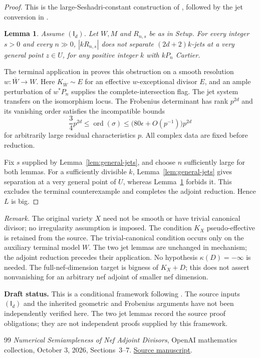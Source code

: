 \documentclass[12pt,a4paper,psamsfonts]{amsart}
\theoremstyle{definition}
\theoremstyle{plain}
\newtheorem{lemma}{Lemma}[section]
\DeclareMathOperator{\ord}{ord}
\begin{document}
\begin{proof}
This is the large-Seshadri-constant construction of
\cite[Section~5]{NS}, followed by the jet conversion in
\cite[Section~6.7]{NS}.

\begin{lemma}\label{lem:general-nojets}
Assume $(\mathsf I_d)$. Let $W,M$ and $R_{n,s}$ be as in Setup.
For every integer $s>0$ and every $n\gg0$, $|kR_{n,s}|$ does not
separate $(2d+2)k$-jets at a very general point $z\in U$, for any
positive integer $k$ with $kP_n$ Cartier.
\end{lemma}

The terminal application in \cite[Section~6.7]{NS} proves this
obstruction on a smooth resolution $w:\overline W\to W$.
Here $K_{\overline W}\sim E$ for an effective $w$-exceptional
divisor $E$, and an ample perturbation of $w^*P_n$ supplies the
complete-intersection flag. The jet system transfers on the
isomorphism locus. The Frobenius determinant has rank
$p^{2d}$ and its vanishing order satisfies the incompatible bounds
\[
 \frac34p^{2d}\le\ord(\sigma)
 \le\bigl(80\epsilon+O(p^{-1})\bigr)p^{2d}
\]
for arbitrarily large residual characteristics $p$. All complex
data are fixed before reduction.

Fix $s$ supplied by Lemma~\ref{lem:general-jets}, and choose
$n$ sufficiently large for both lemmas. For a sufficiently
divisible $k$, Lemma~\ref{lem:general-jets} gives separation at a
very general point of $U$, whereas
Lemma~\ref{lem:general-nojets} forbids it. This excludes the
terminal counterexample and completes the adjoint reduction.
Hence $L$ is big.
\end{proof}

\medskip
\noindent\textit{Remark.}
The original variety $X$ need not be smooth or have trivial
canonical divisor; no irregularity assumption is imposed.
The condition $K_X$ pseudo-effective is retained from the source.
The trivial-canonical condition occurs only on the auxiliary
terminal model $W$. The two jet lemmas are unchanged in mechanism;
the adjoint reduction precedes their application. No hypothesis
$\kappa(D)=-\infty$ is needed. The full-nef-dimension target is
bigness of $K_X+D$; this does not assert nonvanishing for an
arbitrary nef adjoint of smaller nef dimension.

\medskip
\noindent\textbf{Draft status.}
This is a conditional framework following \cite[Sections~3--7]{NS}.
The source inputs $(\mathsf I_d)$ and the inherited geometric and
Frobenius arguments have not been independently verified here.
The two jet lemmas record the source proof obligations; they are
not independent proofs supplied by this framework.

\begin{thebibliography}{99}
\emph{Numerical Semiampleness of Nef Adjoint Divisors},
OpenAI mathematics collection, October 3, 2026,
Sections~3--7.
\href{https://github.com/openai/math/blob/main/preprints/Numerical-Semiampleness-of-Nef-Adjoint-Divisors-October-3-2026/paper.pdf}{Source manuscript}.
\end{thebibliography}
\end{document}
